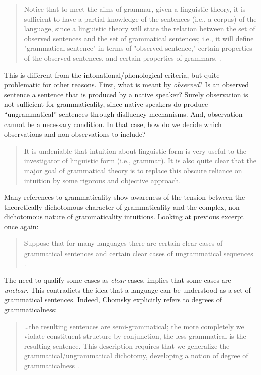 \begin{quote}	
  Notice that to meet the aims of grammar, given a linguistic theory, it is sufficient to have a partial knowledge of the sentences (i.e., a corpus) of the language, since a linguistic theory will state the relation between the set of observed sentences and the set of grammatical sentences; i.e., it will define "grammatical sentence" in terms of "observed sentence," certain properties of the observed sentences, and certain properties of grammars. \citep[14]{Chomsky1957}.
\end{quote}

  This is different from the intonational/phonological criteria, but quite problematic for other reasons. First, what is meant by \textit{observed}? Is an observed sentence a sentence that is produced by a native speaker? Surely observation is not sufficient for grammaticality, since native speakers do produce “ungrammatical” sentences through disfluency mechanisms. And, observation cannot be a necessary condition. In that case, how do we decide which observations and non-observations to include?
  
\begin{quote}	
It is undeniable that intuition about linguistic form is very useful to the investigator of linguistic form (i.e., grammar). It is also quite clear that the major goal of grammatical theory is to replace this obscure reliance on intuition by some rigorous and objective approach. \citep[93-94]{Chomsky1957}
\end{quote}

  Many references to grammaticality show awareness of the tension between the theoretically dichotomous character of grammaticality and the complex, non-dichotomous nature of grammaticality intuitions. Looking at previous excerpt once again:

\begin{quote}	
Suppose that for many languages there are certain clear cases of grammatical sentences and certain clear cases of ungrammatical sequences \citep[113]{Chomsky1956}.
\end{quote}

The need to qualify some cases as \textit{clear} cases, implies that some cases are \textit{unclear}. This contradicts the idea that a language can be understood as a set of grammatical sentences. Indeed, Chomsky explicitly refers to degrees of grammaticalness: 

\begin{quote}	
…the resulting sentences are semi-grammatical; the more completely we violate constituent structure by conjunction, the less grammatical is the resulting sentence. This description requires that we generalize the grammatical/ungrammatical dichotomy, developing a notion of degree of grammaticalness \citep[36]{Chomsky1957}.
\end{quote}

